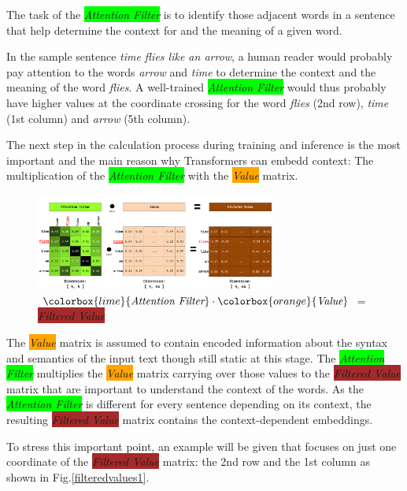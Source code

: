 The task of the \colorbox{lime}{\emph{Attention Filter}} is to identify those adjacent words in a sentence that help determine the context for and
the meaning of a given word.

In the sample sentence \emph{time flies like an arrow}, a human reader would probably pay attention to the words \emph{arrow} and \emph{time} to determine the context and the meaning of the word \emph{flies}.
A well-trained \colorbox{lime}{\emph{Attention Filter}} would thus probably have higher values at the coordinate crossing for the word \emph{flies} (2nd row), \emph{time} (1st column) and \emph{arrow} (5th column).

The next step in the calculation process during training and inference is the most important and the main reason why \glspl{Transformer} can embedd context:
The multiplication of the \colorbox{lime}{\emph{Attention Filter}} with the \colorbox{orange}{\emph{Value}} matrix.

\begin{figure}[H]
	\centering
	\includegraphics[width=0.7\textwidth]{Assets/filter1}
	\caption{$\colorbox{lime}{\emph{Attention Filter}} \cdot \colorbox{orange}{\emph{Value}}$ = \colorbox{brown}{\emph{Filtered Value}}}
	\label{filter1}
\end{figure}

The \colorbox{orange}{\emph{Value}} matrix is assumed to contain encoded information about the syntax and semantics of the input text though still static at this stage.
The \colorbox{lime}{\emph{Attention Filter}} multiplies the \colorbox{orange}{\emph{Value}} matrix carrying over those values to the \colorbox{brown}{\emph{Filtered Value}} matrix that are important to understand the context of the words.
As the \colorbox{lime}{\emph{Attention Filter}} is different for every sentence depending on its context, the resulting \colorbox{brown}{\emph{Filtered Value}} matrix contains the context-dependent embeddings.

To stress this important point, an example will be given that focuses on just one coordinate of the \colorbox{brown}{\emph{Filtered Value}} matrix: the 2nd row and the 1st column as shown in Fig.\ref{filteredvalues1}.

